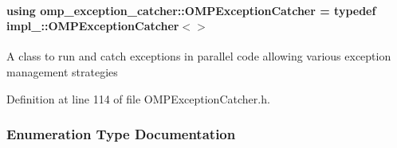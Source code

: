 \paragraph[{\texorpdfstring{O\+M\+P\+Exception\+Catcher}{OMPExceptionCatcher}}]{\setlength{\rightskip}{0pt plus 5cm}using {\bf omp\+\_\+exception\+\_\+catcher\+::\+O\+M\+P\+Exception\+Catcher} = typedef {\bf impl\+\_\+\+::\+O\+M\+P\+Exception\+Catcher}$<$$>$}\hypertarget{namespaceomp__exception__catcher_ad61d95729373b0e8ffbabdfcde3ecb61}{}\label{namespaceomp__exception__catcher_ad61d95729373b0e8ffbabdfcde3ecb61}
A class to run and catch exceptions in parallel code allowing various exception management strategies 

Definition at line 114 of file O\+M\+P\+Exception\+Catcher.\+h.



\subsubsection{Enumeration Type Documentation}
